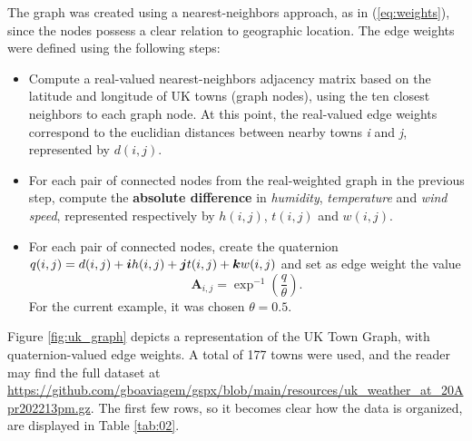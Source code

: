 The graph was created using a nearest-neighbors approach, as in (\ref{eq:weights}), since the nodes possess a clear relation to geographic location. The edge weights were defined using the following steps:
\begin{itemize}[noitemsep]
\item Compute a real-valued nearest-neighbors adjacency matrix based on the latitude and longitude of UK towns (graph nodes), using the ten closest neighbors to each graph node. At this point, the real-valued edge weights correspond to the euclidian distances between nearby towns \textit{i} and \textit{j}, represented by ${d}(i, j)$.
\item For each pair of connected nodes from the real-weighted graph in the previous step, compute the \textbf{absolute difference} in \textit{humidity}, \textit{temperature} and \textit{wind speed}, represented respectively by ${h}(i, j)$, ${t}(i, j)$ and ${w}(i, j)$.
\item For each pair of connected nodes, create the quaternion $q(i, j) = {d}(i, j) + \boldsymbol{i} {h}(i, j) + \boldsymbol{j} {t}(i, j) + \boldsymbol{k} {w}(i, j)$ and set as edge weight the value
\begin{equation}
\mathbf{A}_{i, j} = \exp^{-1} \left(\frac{q}{\theta} \right).
\end{equation}
For the current example, it was chosen $\theta = 0.5$.
\end{itemize}
Figure \ref{fig:uk_graph} depicts a representation of the UK Town Graph, with quaternion-valued edge weights. A total of 177 towns were used, and the reader may find the full dataset at \url{https://github.com/gboaviagem/gspx/blob/main/resources/uk_weather_at_20Apr202213pm.gz}. The first few rows, so it becomes clear how the data is organized, are displayed in Table \ref{tab:02}.


